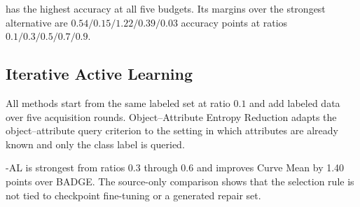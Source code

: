 \model has the highest accuracy at all five budgets. Its margins over the strongest alternative are $0.54/0.15/1.22/0.39/0.03$ accuracy points at ratios $0.1/0.3/0.5/0.7/0.9$.

\subsection{Iterative Active Learning}

All methods start from the same labeled set at ratio $0.1$ and add labeled data over five acquisition rounds. Object--Attribute Entropy Reduction adapts the object--attribute query criterion to the setting in which attributes are already known and only the class label is queried.

\begin{table}[htbp]
\centering
\caption{ImageNet10 source-only iterative active learning. Metric: five-seed mean test accuracy (\%); Curve Mean averages ratios $0.1$--$0.6$.}
\label{tab:source-only-active-learning}
\small
\setlength{\tabcolsep}{3pt}
\end{table}

\modelplain-AL is strongest from ratios $0.3$ through $0.6$ and improves Curve Mean by 1.40 points over BADGE. The source-only comparison shows that the selection rule is not tied to checkpoint fine-tuning or a generated repair set.


